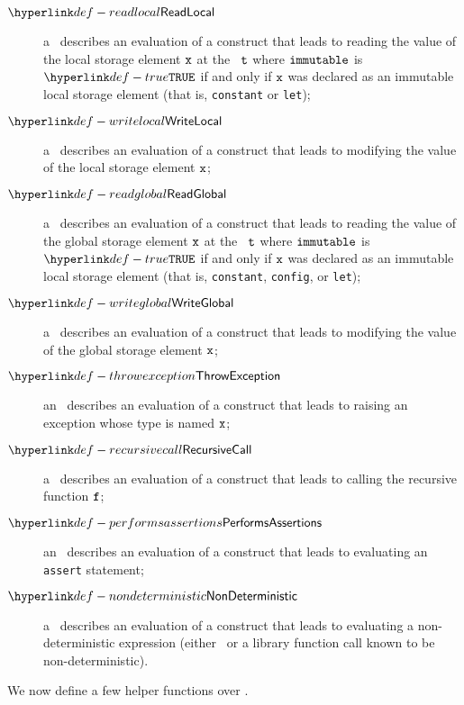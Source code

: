 \begin{description}
    \item[$\ReadLocal$] a \ReadLocalTerm\ describes an evaluation of a construct that leads to reading the value of the local storage element
        $\texttt{x}$ at the \timeframeterm\ $\texttt{t}$ where $\texttt{immutable}$ is $\True$ if and only if $\texttt{x}$
        was declared as an immutable local storage element (that is, \texttt{constant} or \texttt{let});
    \hypertarget{def-writelocalterm}{}
    \item[$\WriteLocal$] a \WriteLocalTerm\ describes an evaluation of a construct that leads to modifying the value of the local storage element
        $\texttt{x}$;
    \hypertarget{def-readglobalterm}{}
    \item[$\ReadGlobal$] a \ReadGlobalTerm\ describes an evaluation of a construct that leads to reading the value of the global storage element
        $\texttt{x}$ at the \timeframeterm\ $\texttt{t}$ where $\texttt{immutable}$ is $\True$ if and only if $\texttt{x}$
        was declared as an immutable local storage element (that is, \texttt{constant}, \texttt{config}, or \texttt{let});
    \hypertarget{def-writeglobalterm}{}
    \item[$\WriteGlobal$] a \WriteGlobalTerm\ describes an evaluation of a construct that leads to modifying the value of the global storage element
        $\texttt{x}$;
    \hypertarget{def-throwexceptionterm}{}
    \item[$\ThrowException$] an \ThrowExceptionTerm\ describes an evaluation of a construct that leads to raising an exception whose type
        is named $\texttt{x}$;
    \hypertarget{def-recursivecallterm}{}
    \item[$\RecursiveCall$] a \RecursiveCallTerm\ describes an evaluation of a construct that leads to calling the recursive function $\texttt{f}$;
    \hypertarget{def-performsassertionsterm}{}
    \item[$\PerformsAssertions$] an \PerformsAssertionsTerm\ describes an evaluation of a construct that leads to evaluating an \texttt{assert} statement;
    \hypertarget{def-nondeterministicterm}{}
    \item[$\NonDeterministic$] a \NonDeterministicTerm\ describes an evaluation of a construct that leads to evaluating a non-deterministic
        expression (either \ARBITRARY\ or a library function call known to be non-deterministic).
\end{description}

We now define a few helper functions over \timeframesterm.

